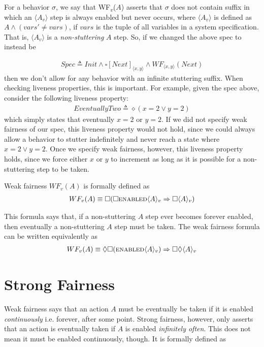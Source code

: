 \documentclass[11pt, oneside]{article}   	%
\begin{document}
For a behavior $\sigma$, we say that WF\textsubscript{$v$}($A$) asserts that $\sigma$ does not contain suffix in which an $\langle A_v \rangle$ step is always enabled but never occurs, where $\langle A_v \rangle$ is defined as $A \wedge (vars' \neq vars)$, if $vars$ is the tuple of all variables in a system specification. That is, $\langle A_v \rangle$ is a \textit{non-stuttering} $A$ step. So, if we changed the above spec to instead be 

\begin{align*}
Spec \triangleq  Init \wedge \square[Next]_{\langle x, y \rangle} \wedge WF_{\langle x, y \rangle}(Next)
\end{align*}
then we don't allow for any behavior with an infinite stuttering suffix. When checking liveness properties, this is important. For example, given the spec above, consider the following  liveness property:
\begin{align*}
EventuallyTwo \triangleq \diamond (x=2 \vee y=2)
\end{align*}
which simply states that eventually $x=2$ or $y=2$. If we did not specify weak fairness of our spec, this liveness property would not hold, since we could always allow a behavior to stutter indefinitely and never reach a state where $x=2 \vee y=2$. Once we specify weak fairness, however, this liveness property holds, since we force either $x$ or $y$ to increment as long as it is possible for a non-stuttering step to be taken.

Weak fairness $WF_v(A)$ is formally defined as 
\begin{align*}
WF_v(A) \equiv \square (\square \textsc{enabled} \langle A \rangle _v \Rightarrow \square \langle A \rangle _v)
\end{align*}

This formula says that, if a non-stuttering $A$ step ever becomes forever enabled, then eventually a non-stuttering $A$ step must be taken. The weak fairness formula can be written equivalently as
\begin{align*}
WF_v(A) \equiv 
\Diamond \square (\textsc{enabled} \langle A \rangle _v) \Rightarrow \square \Diamond \langle A \rangle _v
\end{align*}

\section*{Strong Fairness}

Weak fairness says that an action $A$ must be eventually be taken if it is enabled \textit{continuously} i.e. forever, after some point. Strong fairness, however, only asserts that an action is eventually taken if $A$ is enabled \textit{infinitely often}. This does not mean it must be enabled continuously, though. It is formally defined as
\end{document}
